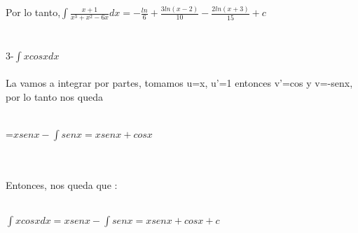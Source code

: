 \documentclass[a4paper,10pt]{article}
\begin{document}
Por lo tanto,$\int \frac{x+1}{x^3 + x^2 -6x} dx  = -\frac{ln}{6} + \frac{3ln(x-2)}{10} - \frac{2ln(x+3)}{15} + c $\\\\\\
3-$\int xcosx dx$\\\\
La vamos a integrar por partes, tomamos u=x, u'=1 entonces v'=cos y v=-senx, por lo tanto nos queda\\\\
\centerline{=$xsenx - \int senx = xsenx + cosx$}\\\\
Entonces, nos queda que :\\\\
\centerline{$\int xcosx dx = xsenx - \int senx = xsenx + cosx + c$}\\\\
\end{document}
